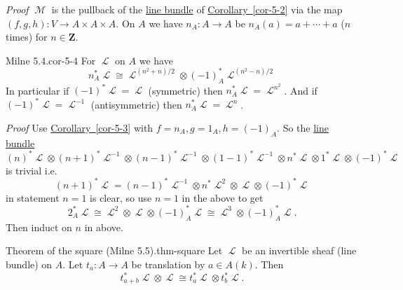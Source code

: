 \documentclass[10pt,]{book}
\makeatletter
\renewcommand*{\proofname}{Proof}
\renewenvironment{proof}[1][\proofname]{\par
  \pushQED{\qed}%
  \normalfont \topsep6\p@\@plus6\p@\relax
  \trivlist
  \item\relax
    {\itshape
    #1\@addpunct{.}}\hspace\labelsep\ignorespaces
}{%
  \popQED\endtrivlist\@endpefalse
}
\numberwithin{equation}{section}
\newcommand{\sheaf}[1]{\operatorname{\mathcal{#1}}}
\newcommand{\ZZ}{\mathbf{Z}}
\makeatother
\begin{document}
\begin{proof}\hypertarget{proof-20}{}
\hypertarget{p-126}{}%
\(\sheaf M\) is the pullback of the \hyperref[def-line-bundle]{line bundle} of \hyperref[cor-5-2]{Corollary~\ref{cor-5-2}} via the map \((f,g,h) \colon V \to A\times A\times A\).%
\end{proof}
\hypertarget{p-127}{}%
On \(A\) we have \(n_A \colon A\to A\) be \(n_A(a) = a+\cdots + a\) (\(n\) times) for \(n\in \ZZ\).%
\begin{corollary}{Milne 5.4.}{}{cor-5-4}%
\hypertarget{p-128}{}%
For \(\sheaf L\) on \(A\) we have%
\begin{equation*}
n^*_A\sheaf L \cong \sheaf L^{(n^2 + n)/2} \otimes (-1)_A^* \sheaf L^{(n^2 - n)/2}
\end{equation*}
In particular if \((-1)^* \sheaf L = \sheaf L\) (symmetric) then \(n_A^* \sheaf L = \sheaf L^{n^2}\). And if \((-1)^* \sheaf L = \sheaf L^{-1}\) (antisymmetric) then \(n_A^* \sheaf L = \sheaf L^{n}\).%
\end{corollary}
\begin{proof}\hypertarget{proof-21}{}
\hypertarget{p-129}{}%
Use \hyperref[cor-5-3]{Corollary~\ref{cor-5-3}} with \(f= n_A, g = 1_A, h = (-1)_A\). So the \hyperref[def-line-bundle]{line bundle}%
\begin{equation*}
(n)^*\sheaf L \otimes (n+1)^*\sheaf L^{-1}\otimes (n-1)^*\sheaf L^{-1}\otimes (1-1)^*\sheaf L^{-1} \otimes   n^*\sheaf L \otimes   1^*\sheaf L \otimes   (-1)^*\sheaf L
\end{equation*}
is trivial i.e.%
\begin{equation*}
(n+1)^*\sheaf L =  (n-1)^*\sheaf L^{-1}\otimes n^*\sheaf L^2 \otimes   \sheaf L \otimes   (-1)^*\sheaf L
\end{equation*}
in statement \(n = 1\) is clear, so use \(n=1\) in the above to get%
\begin{equation*}
2_A^*\sheaf L \cong \sheaf L^2 \otimes \sheaf L \otimes (-1)^*_A \sheaf L\cong \sheaf L^3 \otimes (-1)_A^*\sheaf  L\text{.}
\end{equation*}
Then induct on \(n\) in above.%
\end{proof}
\begin{theorem}{Theorem of the square (Milne 5.5).}{}{thm-square}%
\hypertarget{p-130}{}%
Let \(\sheaf L\) be an invertible sheaf (line bundle) on \(A\). Let \(t_a \colon A\to A\) be translation by \(a\in A(k)\). Then%
\begin{equation*}
t_{a+b}^*\sheaf L \otimes \sheaf L \cong t_a^*\sheaf L \otimes t_b^* \sheaf L\text{.}
\end{equation*}
%
\end{theorem}
\end{document}
